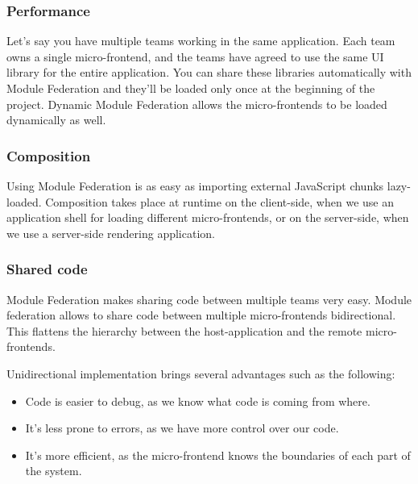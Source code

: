 \subsubsection{Performance}\label{subsubsection:background:micro-frontend:module-federation:performance}

Let's say you have multiple teams working in the same application. Each team owns a single micro-frontend, and the teams have agreed to use the same UI library for the entire application. You can share these libraries automatically with Module Federation and they'll be loaded only once at the beginning of the project. Dynamic Module Federation allows the micro-frontends to be loaded dynamically as well. \cite[83]{book:2021:mezzalira:applied-methods:building-micro-frontends}

\subsubsection{Composition}\label{subsubsection:background:micro-frontend:module-federation:composition}

Using Module Federation is as easy as importing external JavaScript chunks lazy-loaded. Composition takes place at runtime on the client-side, when we use an application shell for loading different micro-frontends, or on the server-side, when we use a server-side rendering application. \cite[84]{book:2021:mezzalira:applied-methods:building-micro-frontends}

\subsubsection{Shared code}\label{subsubsection:background:micro-frontend:module-federation:shared-code}

Module Federation makes sharing code between multiple teams very easy. Module federation allows to share code between multiple micro-frontends bidirectional. This flattens the hierarchy between the host-application and the remote micro-frontends.

\noindent Unidirectional implementation brings several advantages such as the following: \cite[84]{book:2021:mezzalira:applied-methods:building-micro-frontends}

\begin{itemize}
    \item Code is easier to debug, as we know what code is coming from where.
    \item It's less prone to errors, as we have more control over our code.
    \item It's more efficient, as the micro-frontend knows the boundaries of each part of the system.
\end{itemize}

